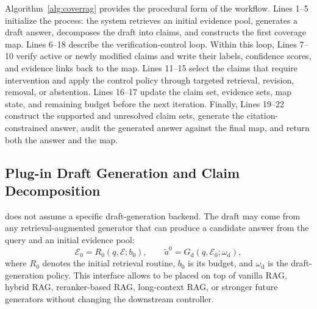 Algorithm~\ref{alg:coverrag} provides the procedural form of the workflow. Lines 1--5 initialize the process: the system retrieves an initial evidence pool, generates a draft answer, decomposes the draft into claims, and constructs the first coverage map. Lines 6--18 describe the verification-control loop. Within this loop, Lines 7--10 verify active or newly modified claims and write their labels, confidence scores, and evidence links back to the map. Lines 11--15 select the claims that require intervention and apply the control policy through targeted retrieval, revision, removal, or abstention. Lines 16--17 update the claim set, evidence sets, map state, and remaining budget before the next iteration. Finally, Lines 19--22 construct the supported and unresolved claim sets, generate the citation-constrained answer, audit the generated answer against the final map, and return both the answer and the map.




\subsection{Plug-in Draft Generation and Claim Decomposition}
\label{subsec:framework_draft_decomp}

\ragname does not assume a specific draft-generation backend. The draft may come from any retrieval-augmented generator that can produce a candidate answer from the query and an initial evidence pool:
\begin{equation}
    \mathcal{E}_0 = R_0(q,\mathcal{E};b_0),
    \qquad
    \tilde{a}^{0}=G_{\mathrm{d}}(q,\mathcal{E}_0;\omega_{\mathrm{d}}),
    \label{eq:framework_draft}
\end{equation}
where $R_0$ denotes the initial retrieval routine, $b_0$ is its budget, and $\omega_{\mathrm{d}}$ is the draft-generation policy. This interface allows \ragname to be placed on top of vanilla RAG, hybrid RAG, reranker-based RAG, long-context RAG, or stronger future generators without changing the downstream controller.

